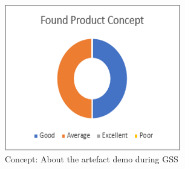 
\begin{figure}[ht]
    \centering
    \includegraphics[scale=0.6]{Figures/product-concept.png}
    \caption{Concept: About the artefact demo during GSS}
    \label{fig:product-concept}
\end{figure}
 \FloatBarrier


